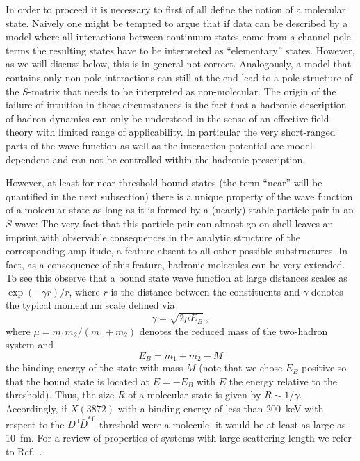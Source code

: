  In order to proceed it is necessary to first of all define the notion of a
 molecular state. Naively one
 might be tempted to argue that if data can be described by a model 
where all interactions between continuum states come from 
  $s$-channel pole terms the resulting states have to be interpreted as
 ``elementary'' states. However, as we will discuss below, this is in
 general not correct.
 Analogously, a model that contains only non-pole interactions can still at the
 end lead to a pole structure of the $S$-matrix that needs to be interpreted as
 non-molecular. The origin of  the failure of intuition in these circumstances
 is the fact that a hadronic description of hadron dynamics can only be
 understood in the sense of an effective field theory with limited range of
 applicability. In particular the very short-ranged parts of the wave function
 as well as the interaction potential are model-dependent and can not be
 controlled within the hadronic prescription. 

 However, at least for near-threshold bound states (the term ``near'' will be
 quantified in the next subsection) there is a unique property of the wave
 function of a molecular state as long as it is formed by a (nearly) stable
 particle pair in an $S$-wave: The very fact that this particle pair can almost
 go on-shell leaves an imprint with observable consequences in the analytic
 structure of the corresponding amplitude, a feature absent to all other
 possible substructures. In fact, as a consequence of this feature, hadronic
 molecules can be very extended. To see this observe that a bound state wave
 function at large distances scales as $\exp(-\gamma r)/r$, where $r$ is the
 distance between the constituents and $\gamma$ denotes the typical momentum
 scale defined via
 \begin{equation}
 \gamma = \sqrt{2\mu E_B} \ ,
 \label{eq:gamdef}
 \end{equation}
 where $\mu=m_1m_2/(m_1+m_2)$ denotes the reduced mass of the two-hadron system
 and 
 \begin{equation}
  E_B = m_1+m_2-M
  \label{eq:Ebdef}
 \end{equation}
 the binding energy of the state with mass $M$ (note that we
 chose $E_B$ positive so that the bound state is located at $E=-E_B$ {with
 $E$ the energy relative to the threshold}).
 Thus, the size $R$ of a molecular state is given by $ R\sim 1/\gamma$.
  Accordingly, if $X(3872)$ with a binding energy of less than 200~keV with
  respect to the
 $D^0\bar D^{*\, 0}$ threshold were a molecule, it would be at least as large as
 10~fm.
 For a review of properties of systems with large scattering length we refer to
 Ref.~\cite{Braaten:2004rn}.
 
